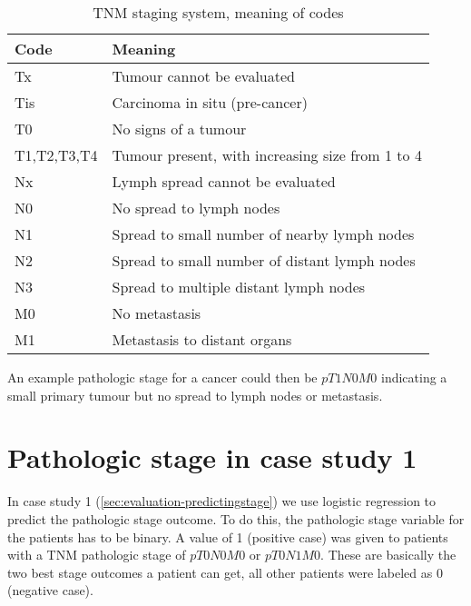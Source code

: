 \begin{table}
	\centering
	\begin{tabular}{ll}
		\toprule
		Code & Meaning \\
		\midrule
		Tx & Tumour cannot be evaluated \\
		Tis & Carcinoma in situ (pre-cancer) \\
		T0 & No signs of a tumour \\
		T1,T2,T3,T4 & Tumour present, with increasing size from 1 to 4 \\
		\midrule
		Nx & Lymph spread cannot be evaluated \\
		N0 & No spread to lymph nodes \\
		N1 & Spread to small number of nearby lymph nodes \\
		N2 & Spread to small number of distant lymph nodes \\
		N3 & Spread to multiple distant lymph nodes \\
		\midrule
		M0 & No metastasis \\
		M1 & Metastasis to distant organs \\
		\bottomrule
	\end{tabular}
	\caption{TNM staging system, meaning of codes}
	\label{tab:TNM}
\end{table}
An example pathologic stage for a cancer could then be $pT1N0M0$ indicating a small primary tumour but no spread to lymph nodes or metastasis.
\section{Pathologic stage in case study 1}
In case study 1 (\ref{sec:evaluation-predictingstage}) we use logistic regression to predict the pathologic stage outcome. To do this, the pathologic stage variable for the patients has to be binary. A value of 1 (positive case) was given to patients with a TNM pathologic stage of $pT0N0M0$ or $pT0N1M0$. These are basically the two best stage outcomes a patient can get, all other patients were labeled as 0 (negative case).


